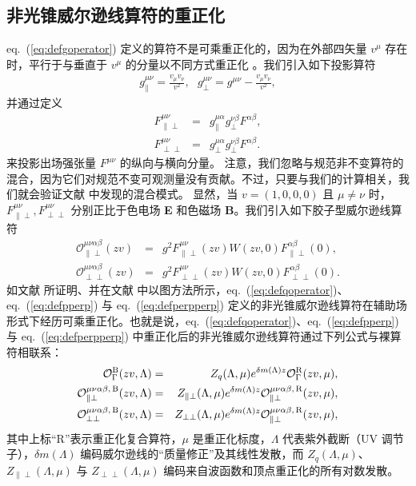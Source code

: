 \subsection{非光锥威尔逊线算符的重正化}
eq.~(\ref{eq:defgoperator}) 定义的算符不是可乘重正化的，因为在外部四矢量 $v^{\mu}$ 存在时，平行于与垂直于 $v^{\mu}$ 的分量以不同方式重正化 \cite{Braun:2020ymy}。我们引入如下投影算符
\begin{eqnarray}
g^{\mu\nu}_{\|} = \frac{v_{\mu}v_{\nu}}{v^2},\, \, \, \, g^{\mu\nu}_{\perp} = g^{\mu\nu} - \frac{v_{\mu}v_{\nu}}{v^2},
\end{eqnarray}
并通过定义
\begin{eqnarray}
F^{\mu\nu}_{\|\perp} &=& g^{\mu\alpha}_{\|}g^{\nu\beta}_{\perp}F^{\alpha\beta},\\
F^{\mu\nu}_{\perp\perp} &=& g^{\mu\alpha}_{\perp}g^{\nu\beta}_{\perp}F^{\alpha\beta}.
\end{eqnarray}
来投影出场强张量 $F^{\mu\nu}$ 的纵向与横向分量。
注意，我们忽略与规范非不变算符的混合，因为它们对规范不变可观测量没有贡献。不过，只要与我们的计算相关，我们就会验证文献 \cite{Dorn:1981wa,Zhang:2018diq,Wang:2019tgg} 中发现的混合模式。
显然，当 $v=(1,0,0,0)$ 且 $\mu\neq\nu$ 时，$F^{\mu\nu}_{\|\perp}, F^{\mu\nu}_{\perp\perp}$ 分别正比于色电场 \textbf{E} 和色磁场 \textbf{B}。我们引入如下胶子型威尔逊线算符
\begin{eqnarray}
\label{eq:defpperp}
\mathcal{O}_{\|\perp}^{\mu\nu\alpha\beta} (zv)&=& g^2 F_{\|\perp}^{\mu\nu}(zv)W(zv,0)F_{\|\perp}^{\alpha\beta}(0),\\
\label{eq:defperpperp}
\mathcal{O}_{\perp\perp}^{\mu\nu\alpha\beta} (zv)&=& g^2 F_{\perp\perp}^{\mu\nu}(zv)W(zv,0)F_{\perp\perp}^{\alpha\beta}(0).
\end{eqnarray}
如文献 \cite{Green:2017xeu, Ji:2017oey, Zhang:2018diq} 所证明、并在文献 \cite{Ishikawa:2017faj, Li:2018tpe} 中以图方法所示，eq.~(\ref{eq:defqoperator})、eq.~(\ref{eq:defpperp}) 与 eq.~(\ref{eq:defperpperp}) 定义的非光锥威尔逊线算符在辅助场形式下经历可乘重正化。也就是说，eq.~(\ref{eq:defqoperator})、eq.~(\ref{eq:defpperp}) 与 eq.~(\ref{eq:defperpperp}) 中重正化后的非光锥威尔逊线算符通过下列公式与裸算符相联系：
\begin{eqnarray}
\mathcal{O}^{\rm B}_{\Gamma}(zv, \Lambda) &=& Z_{q}(\Lambda,\mu) e^{\delta m(\Lambda)z} \mathcal{O}^{\rm R}_{\Gamma}(zv, \mu),\\
\mathcal{O}^{\mu\nu\alpha\beta,\, \rm B}_{\|\perp}(zv, \Lambda) &=& Z_{\|\perp}(\Lambda,\mu) e^{\delta m(\Lambda)z} \mathcal{O}_{\|\perp}^{\mu\nu\alpha\beta,\, \rm R}(zv, \mu),\\
\mathcal{O}^{\mu\nu\alpha\beta,\, \rm B}_{\perp\perp}(zv, \Lambda) &=& Z_{\perp\perp}(\Lambda,\mu) e^{\delta m(\Lambda)z} \mathcal{O}_{\|\perp}^{\mu\nu\alpha\beta,\, \rm R}(zv, \mu),
\end{eqnarray}
其中上标``R''表示重正化复合算符，$\mu$ 是重正化标度，$\Lambda$ 代表紫外截断（UV 调节子），$\delta m(\Lambda)$ 编码威尔逊线的``质量修正''及其线性发散，而 $Z_{q}(\Lambda,\mu)$、$Z_{\|\perp}(\Lambda,\mu)$ 与 $Z_{\perp\perp}(\Lambda,\mu)$ 编码来自波函数和顶点重正化的所有对数发散。


